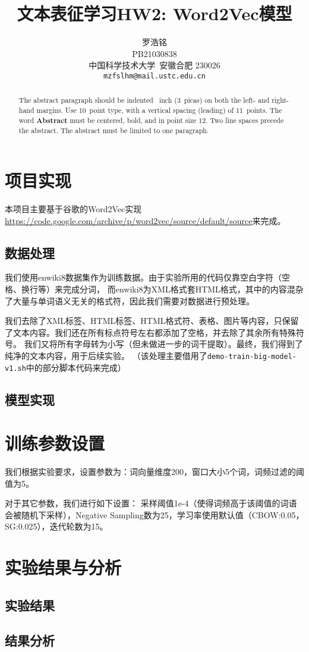 \documentclass{article}
\title{文本表征学习HW2: Word2Vec模型}
\author{
  罗浩铭 \\
  PB21030838\\
  中国科学技术大学\ 安徽合肥 230026 \\
  \texttt{mzfslhm@mail.ustc.edu.cn} \\
}
\begin{document}
\maketitle


\begin{abstract}
  The abstract paragraph should be indented ~inch (3~picas) on
  both the left- and right-hand margins. Use 10~point type, with a vertical
  spacing (leading) of 11~points.  The word \textbf{Abstract} must be centered,
  bold, and in point size 12. Two line spaces precede the abstract. The abstract
  must be limited to one paragraph.
\end{abstract}

\section{项目实现}

本项目主要基于谷歌的Word2Vec实现\url{https://code.google.com/archive/p/word2vec/source/default/source}来完成。

\subsection{数据处理}

我们使用enwiki8数据集作为训练数据。由于实验所用的代码仅靠空白字符（空格、换行等）来完成分词，
而enwiki8为XML格式套HTML格式，其中的内容混杂了大量与单词语义无关的格式符，因此我们需要对数据进行预处理。

我们去除了XML标签、HTML标签、HTML格式符、表格、图片等内容，只保留了文本内容。我们还在所有标点符号左右都添加了空格，并去除了其余所有特殊符号。
我们又将所有字母转为小写（但未做进一步的词干提取）。最终，我们得到了纯净的文本内容，用于后续实验。
（该处理主要借用了\texttt{demo-train-big-model-v1.sh}中的部分脚本代码来完成）


\subsection{模型实现}


\section{训练参数设置}
我们根据实验要求，设置参数为：词向量维度200，窗口大小5个词，词频过滤的阈值为5。

对于其它参数，我们进行如下设置：
采样阈值1e-4（使得词频高于该阈值的词语会被随机下采样），Negative Sampling数为25，学习率使用默认值（CBOW:0.05，SG:0.025），迭代轮数为15。





\section{实验结果与分析}

\subsection{实验结果}

\subsection{结果分析}
\end{document}
